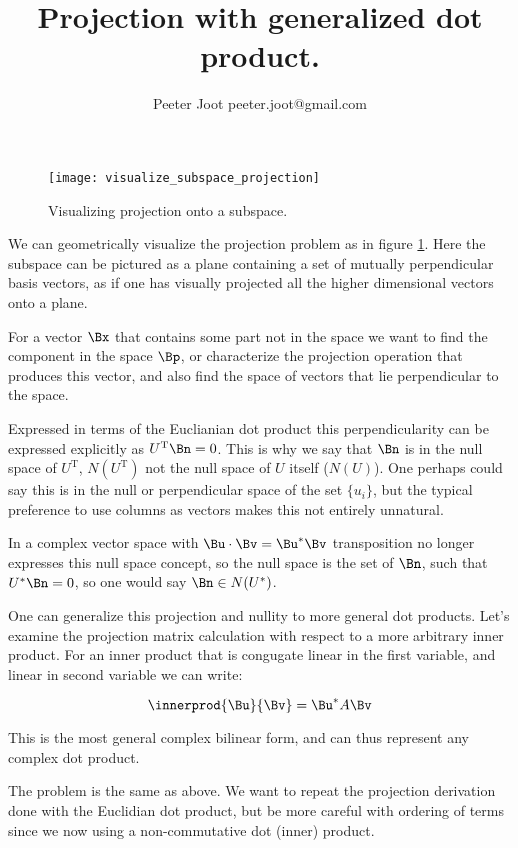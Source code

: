 \documentclass{article}      %
\title{ Projection with generalized dot product. }
\author{Peeter Joot \quad peeter.joot@gmail.com}         %
\newcommand{\T}[0]{\text{T}}
\begin{document}

\maketitle{}

\begin{figure}[htp]
\centering
\texttt{[image: visualize\_subspace\_projection]}
\caption{Visualizing projection onto a subspace.}\label{fig:Projection_subspace}
\end{figure}

We can geometrically visualize the projection problem 
as in figure \ref{fig:Projection_subspace}.  Here
the subspace can be pictured
as a plane containing a set of mutually perpendicular basis vectors, as if
one has visually projected all the higher dimensional vectors onto a plane.

For a vector $\Bx$ that contains some part not in the space we want to find
the component in the space $\Bp$, or characterize the projection operation
that produces this vector, and also find the space of vectors that lie
perpendicular to the space.

Expressed in terms of 
the Euclianian dot product this perpendicularity can be expressed explicitly as
$U^\T \Bn = 0$.
This is why we say that $\Bn$ is in the null space of $U^\T$,
$N(U^\T)$ not the null space of $U$ itself ($N(U)$).  One perhaps could say this is in the null
or perpendicular space of the set $\{u_i\}$, but the typical preference to use columns as
vectors makes this not entirely unnatural.

In a complex vector space with $\Bu \cdot \Bv = \Bu^* \Bv$ transposition no longer expresses this
null space concept, so the null space 
is the set of $\Bn$, such that $U^* \Bn = 0$, so one would say $\Bn \in N(U^*)$.

One can generalize this projection and nullity to more general dot products.  Let's examine the projection
matrix calculation with respect to a more arbitrary inner product.  For an inner product that is congugate linear in the first variable, and linear in second variable
we can write:

\[
\innerprod{\Bu}{\Bv} = \Bu^* A \Bv
\]

This is the most general complex bilinear form, and can thus represent any complex dot product.

The problem is the same as above.  We want to repeat the projection derivation
done with the Euclidian dot product, but
be more careful with ordering of terms since we now using a non-commutative dot (inner) product.
\end{document}
